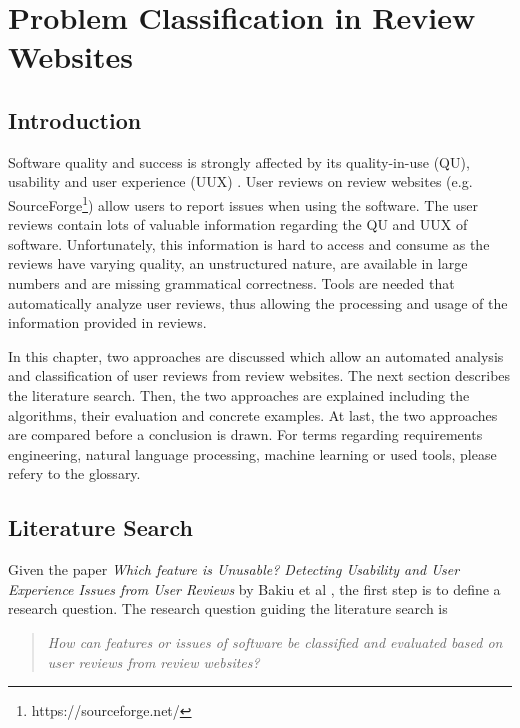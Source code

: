 \chapter{Problem Classification in Review Websites}

\section{Introduction}
Software quality and success is strongly affected by its quality-in-use (QU), usability and user experience (UUX) \cite{Bakiu2017}. User reviews on review websites (e.g. SourceForge\footnote{https://sourceforge.net/}) allow users to report issues when using the software. The user reviews contain lots of valuable information regarding the QU and UUX of software. Unfortunately, this information is hard to access and consume as the reviews have varying quality, an unstructured nature, are available in large numbers and are missing grammatical correctness. Tools are needed that automatically analyze user reviews, thus allowing the processing and usage of the information provided in reviews.

In this chapter, two approaches are discussed which allow an automated analysis and classification of user reviews from review websites. The next section describes the literature search. Then, the two approaches are explained including the algorithms, their evaluation and concrete examples. At last, the two approaches are compared before a conclusion is drawn. For terms regarding requirements engineering, natural language processing, machine learning or used tools, please refery to the glossary.


\section{Literature Search}
Given the paper \textit{Which feature is Unusable? Detecting Usability and User Experience Issues from User Reviews} by Bakiu et al \cite{Bakiu2017}, the first step is to define a research question. The research question guiding the literature search is
\begin{quote}
    \textit{How can features or issues of software be classified and evaluated based on user reviews from review websites?}
\end{quote}

